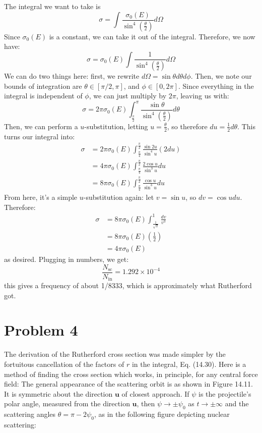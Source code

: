 \documentclass[10pt]{article}
\begin{document}
	\begin{solution}
		The integral we want to take is 
		\[
			\sigma = \int \frac{\sigma_0(E)}{\sin^4(\frac{\theta}{2})} d\Omega
		\] 
		Since $\sigma_0(E)$ is a constant, we can take it out of the integral. Therefore, we now have:
		\[
			\sigma = \sigma_0(E) \int \frac{1}{\sin^4(\frac{\theta}{2})} d\Omega
		\] 
		We can do two things here: first, we rewrite $d\Omega = \sin \theta d\theta d\phi$. Then, we note our
		bounds of integration are $\theta \in [\pi/2, \pi]$, and 
		$\phi \in [0, 2\pi]$. Since everything in the integral is independent of $\phi$, we can just multiply by
		$2\pi$, leaving us with:
		\[
			\sigma = 2\pi \sigma_0(E) \int_{\frac{\pi}{2}}^\pi \frac{\sin \theta}{\sin^4(\frac{\theta}{2})} 
			d\theta
		\] 
		Then, we can perform a $u$-substitution, letting $u = \frac{\theta}{2}$, so therefore $du = \frac{1}{2}
		d\theta$. This turns our integral into: 
		\begin{align*}
			\sigma &= 2\pi \sigma_0(E) \int_{\frac{\pi}{4}}^{\frac{\pi}{2}} \frac{\sin 2u}{\sin^4u} (2 du)\\
				   &= 4\pi \sigma_0(E) \int_{\frac{\pi}{4}}^\frac{\pi}{2}\frac{2 \cos u}{\sin^3 u} du \\ 
				   &= 8 \pi \sigma_0(E) \int_{\frac{\pi}{4}}^{\frac{\pi}{2}} \frac{\cos u}{\sin^3 u} du
		\end{align*}
		From here, it's a simple $u$-substitution again: let $v = \sin u$, so $dv = \cos u du$. Therefore:
		\begin{align*}
			\sigma &= 8\pi \sigma_0(E) \int_{\frac{1}{\sqrt{2} }}^1 \frac{dv}{v^3}\\
				&= 8\pi \sigma_0(E) (\frac{1}{2})\\
				&= 4\pi \sigma_0(E) 
		\end{align*}
		as desired. Plugging in numbers, we get:
		\[
			\frac{N_{\text{sc}}}{N_{\text{in}}} = 1.292 \times 10^{-4}
		\] 
		this gives a frequency of about 1/8333, which is approximately what Rutherford got.
	\end{solution}


	\pagebreak

	\section*{Problem 4}
	The derivation of the Rutherford cross section was made simpler by the fortuitous cancellation of the factors
	of $r$ in the integral, Eq. (14.30). Here is a method of finding the cross section which works, in principle,
	for any central force field: The general appearance of the scattering orbit is as shown in Figure 14.11. It 
	is symmetric about the direction $\mathbf u$ of closest approach. If $\psi$ is the projectile's polar 
	angle, measured from the direction $\mathbf u$, then $\psi \to \pm \psi_0$ as $t \to \pm \infty$ and the 
	scattering angles $\theta = \pi - 2\psi_0$, as in the following figure depicting nuclear scattering:
\end{document}
